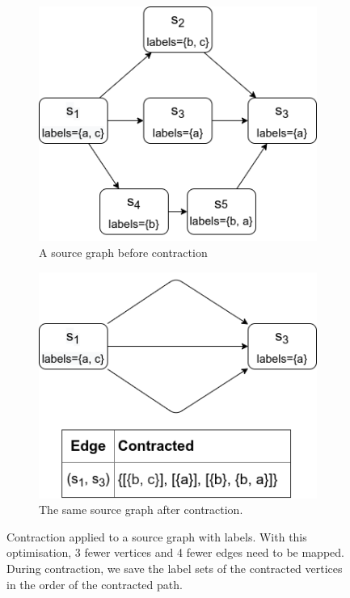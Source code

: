 \begin{figure}[ht]
\begin{subfigure}{.5\textwidth}
  \centering
\includegraphics[scale=0.6]{images/contraction/after.png}
  \caption{A source graph before contraction}
\end{subfigure}
\begin{subfigure}{.5\textwidth}
  \centering
\includegraphics[scale=0.6]{images/contraction/before.png}
  \caption{The same source graph after contraction.}
\end{subfigure}
\caption{Contraction applied to a source graph with labels. With this optimisation, 3 fewer vertices and 4 fewer edges need to be mapped. During contraction, we save the label sets of the contracted vertices in the order of the contracted path.}
\label{fig:contraction}
\end{figure}

